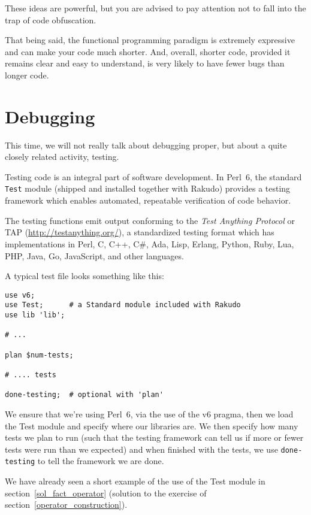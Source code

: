 These ideas are powerful, but you are advised to pay 
attention not to fall into the trap of code obfuscation.

That being said, the functional programming paradigm 
is extremely expressive and can make your code much 
shorter. And, overall, shorter code, provided it remains 
clear and easy to understand, is very likely to have 
fewer bugs than longer code.

\section{Debugging}
\label{test_module}

This time, we will not really talk about debugging proper, 
but about a quite closely related activity, testing.

Testing code is an integral part of software development. In 
Perl~6, the standard {\tt Test} module (shipped and installed 
together with Rakudo) provides a testing framework which enables 
automated, repeatable verification of code behavior.

The testing functions emit output conforming to the \emph{Test 
Anything Protocol} or TAP (\url{http://testanything.org/}), a 
standardized testing format which has implementations in Perl, 
C, C++, C\#, Ada, Lisp, Erlang, Python, Ruby, Lua, PHP, Java, 
Go, JavaScript, and other languages.

A typical test file looks something like this:

\begin{verbatim}
use v6;
use Test;      # a Standard module included with Rakudo
use lib 'lib';

# ...

plan $num-tests;

# .... tests

done-testing;  # optional with 'plan'
\end{verbatim}

We ensure that we're using Perl~6, via the use of the v6 pragma, 
then we load the Test module and specify where our 
libraries are. We then specify how many tests we plan 
to run (such that the testing framework can tell us 
if more or fewer tests were run than we expected) 
and when finished with the tests, we use {\tt done-testing} 
to tell the framework we are done.

We have already seen a short example of the use of the Test 
module in section~\ref{sol_fact_operator} (solution 
to the exercise of section~\ref{operator_construction}).

